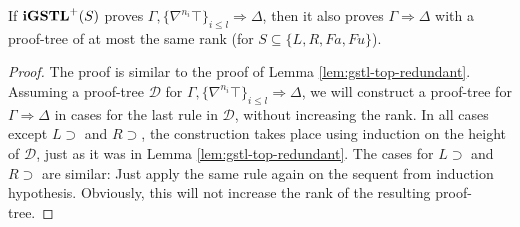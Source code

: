 \begin{lem}\label{lem:igstl-top-redundant} If $\mathbf{iGSTL}^+(S)$ proves $\Gamma , \{\nabla^{n_i} \top\}_{i \leq l} \Rightarrow \Delta$, then it also proves $\Gamma \Rightarrow \Delta$ with a proof-tree of at most the same rank (for $S \subseteq \{L, R, Fa, Fu\}$).
\end{lem}
\begin{proof}
  The proof is similar to the proof of Lemma \ref{lem:gstl-top-redundant}. Assuming a proof-tree $\mathcal{D}$ for $\Gamma , \{\nabla^{n_i} \top\}_{i \leq l} \Rightarrow \Delta$, we will construct a proof-tree for $\Gamma \Rightarrow \Delta$ in cases for the last rule in $\mathcal{D}$, without increasing the rank. In all cases except $L \supset$ and $R \supset$, the construction takes place using induction on the height of $\mathcal{D}$, just as it was in Lemma \ref{lem:gstl-top-redundant}. The cases for $L \supset$ and $R \supset$ are similar: Just apply the same rule again on the sequent from induction hypothesis. Obviously, this will not increase the rank of the resulting proof-tree.
\end{proof}